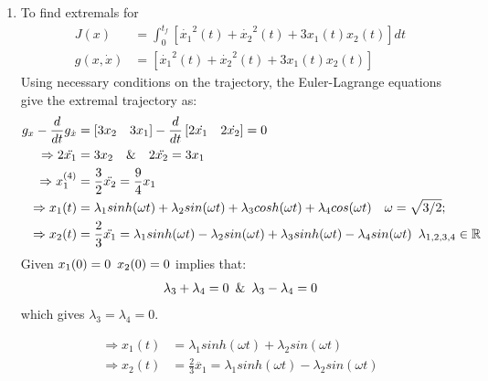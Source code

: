 \begin{enumerate}
  \item To find extremals for 
  \begin{align*}
    J(x) &= \int_0^{t_f} [{\dot{x_1}}^2(t) + {\dot{x_2}}^2(t) + 3 x_1(t) x_2(t) ] dt\\
    g(x,\dot{x}) &= [{\dot{x_1}}^2(t) + {\dot{x_2}}^2(t) + 3 x_1(t) x_2(t) ]
  \end{align*}
  Using necessary conditions on the trajectory, the Euler-Lagrange equations give the extremal trajectory as:
  \begin{align*}
  g_x - \frac{d}{dt} g_{\dot x}  &= \left[ 3 x_2 \quad 3 x_1\right] - \frac{d}{dt} \left[ 2 \dot{x_1}\quad 2\dot{x_2}\right] = 0\\
  \Rightarrow 2 \ddot{x_1} &= 3 x_2 \quad \& \quad 2 \ddot{x_2} = 3 x_1 \\
  \Rightarrow x_1^{(4)} &= \frac{3}{2} \ddot{x_2} = \frac{9}{4} x_1 \\
  \Rightarrow x_1(t) &= \lambda_1 sinh(\omega t) + \lambda_2 sin(\omega t) + \lambda_3 cosh(\omega t) + \lambda_4 cos(\omega t) \quad \omega = \sqrt{3/2};\\
  \Rightarrow x_2(t) &= \frac{2}{3} \ddot{x_1} = \lambda_1 sinh(\omega t) - \lambda_2 sin(\omega t) + \lambda_3 sinh(\omega t) - \lambda_4 sin(\omega t) \enskip \lambda_{1,2,3,4} \in \mathbb{R}\\
  \end{align*}
  Given $x_1(0) = 0 \enskip x_2(0) = 0$ implies that:
  \begin{equation*}
   \lambda_3 + \lambda_4 = 0 \enskip \& \enskip \lambda_3 - \lambda_4 = 0
  \end{equation*}
  which gives $\lambda_3 = \lambda_4 = 0$.
  
  \begin{align}
  \Rightarrow x_1(t) &= \lambda_1 sinh(\omega t) + \lambda_2 sin(\omega t) \label{eqn:2.axt}\\
  \Rightarrow x_2(t) &= \frac{2}{3} \ddot{x_1} = \lambda_1 sinh(\omega t) - \lambda_2 sin(\omega t) \label{eqn:2.bxt} 
  \end{align}


\end{enumerate}
